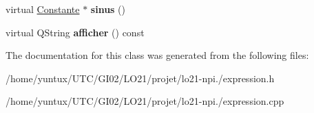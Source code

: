\begin{DoxyCompactItemize}
\item 
\hypertarget{class_expression_aa9a4937398cd9da2e1b4d79616c54f1d}{virtual \hyperlink{class_constante}{\-Constante} $\ast$ {\bfseries sinus} ()}\label{class_expression_aa9a4937398cd9da2e1b4d79616c54f1d}

\item 
\hypertarget{class_expression_a7325926b23a9d2f936524043e68a95e8}{virtual \-Q\-String {\bfseries afficher} () const }\label{class_expression_a7325926b23a9d2f936524043e68a95e8}

\end{DoxyCompactItemize}


\-The documentation for this class was generated from the following files\-:\begin{DoxyCompactItemize}
\item 
/home/yuntux/\-U\-T\-C/\-G\-I02/\-L\-O21/projet/lo21-\/npi./expression.\-h\item 
/home/yuntux/\-U\-T\-C/\-G\-I02/\-L\-O21/projet/lo21-\/npi./expression.\-cpp\end{DoxyCompactItemize}
